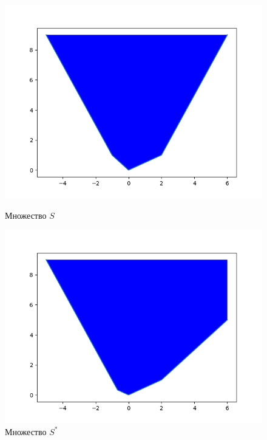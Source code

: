 \documentclass{article}
\begin{document}
\begin{figure}[H]
    \centering
    \begin{minipage}[b]{0.45\textwidth}
        \includegraphics[scale=0.5]{plot.png}
        \caption{Множество $S$}
    \end{minipage}
    \begin{minipage}[b]{0.45\textwidth}
        \includegraphics[scale=0.5]{plot_.png}
        \caption{Множество $S^\ast$}
    \end{minipage}
\end{figure}
\end{document}
